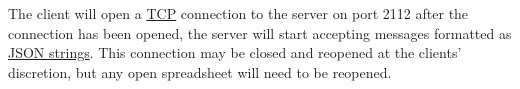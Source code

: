 The client will open a \href{https://en.wikipedia.org/wiki/Transmission_Control_Protocol}{TCP} 
connection to the server on port 2112 after the connection has been opened, 
the server will start accepting messages formatted as \href{https://en.wikipedia.org/wiki/JSON}{JSON strings}. 
This connection may be closed and reopened at the clients’ discretion, but any open spreadsheet will need to be reopened.

